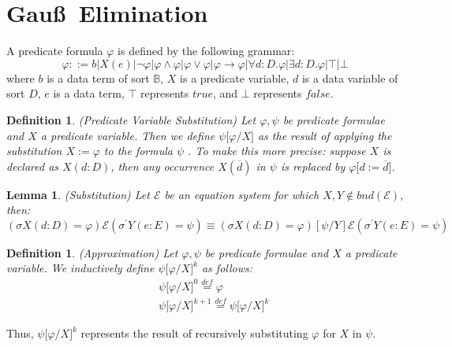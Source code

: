 \documentclass{article}
\newtheorem{definition}[theorem]{Definition}
\newtheorem{lemma}[theorem]{Lemma}
\begin{document}
\newpage

\section{Gau\ss\ Elimination}

A predicate formula $\varphi $ is defined by the following grammar:%
\begin{equation*}
\varphi ::=b|X(e)|\lnot \varphi |\varphi \wedge \varphi |\varphi \vee
\varphi |\varphi \rightarrow \varphi |\forall d:D.\varphi |\exists
d:D.\varphi |\top |\bot
\end{equation*}%
where $b$ is a data term of sort $\mathbb{B}$, $X$ is a predicate variable, $%
d$ is a data variable of sort $D$, $e$ is a data term, $\top $ represents $%
true$, and $\bot $ represents $false$.

\begin{definition}
(Predicate Variable Substitution) Let $\varphi ,\psi $ be predicate formulae
and $X$ a predicate variable. Then we define $\psi \lbrack \varphi /X]$ as
the result of applying the substitution $X:=\varphi $ to the formula $\psi $%
. To make this more precise: suppose $X$ is declared as $X(d:D)$, then any
occurrence $X(\overline{d})$ in $\psi $ is replaced by $\varphi \lbrack d:=%
\overline{d}]$.
\end{definition}

\begin{lemma}
(Substitution) Let $\mathcal{E}$ be an equation system for which $X,Y\notin
bnd(\mathcal{E})$, then:%
\begin{equation*}
(\sigma X(d:D)=\varphi )\mathcal{E}(\sigma ^{\prime }Y(e:E)=\psi )\equiv
(\sigma X(d:D)=\varphi )[\psi /Y]\mathcal{E}(\sigma ^{\prime }Y(e:E)=\psi )
\end{equation*}
\end{lemma}

\begin{definition}
(Approximation) Let $\varphi ,\psi $ be predicate formulae and $X$ a
predicate variable. We inductively define $\psi \lbrack \varphi /X]^{k}$ as
follows:%
\begin{eqnarray*}
&&\psi \lbrack \varphi /X]^{0}\overset{def}{=}\varphi \\
&&\psi \lbrack \varphi /X]^{k+1}\overset{def}{=}\psi \lbrack \varphi /X]^{k}
\end{eqnarray*}
\end{definition}

Thus, $\psi \lbrack \varphi /X]^{k}$ represents the result of recursively
substituting $\varphi $ for $X$ in $\psi $.
\end{document}

